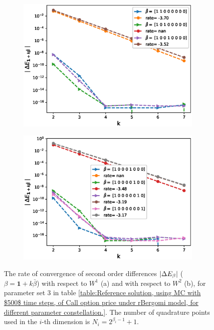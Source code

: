 \begin{figure}[h!]
	\centering
	\begin{subfigure}{.3\textwidth}
		\centering
		\includegraphics[width=1\linewidth]{./figures/rBergomi_mixed_error_rates/without_change_measure/N_4/H_002/mixed_difference_order2_rbergomi_4steps_H_002_K_1_totally_hierarch_with_rate_W1}
		\caption{}
		\label{fig:sub3}
	\end{subfigure}%
	\begin{subfigure}{.3\textwidth}
		\centering
		\includegraphics[width=1\linewidth]{./figures/rBergomi_mixed_error_rates/without_change_measure/N_4/H_002/mixed_difference_order2_rbergomi_4steps_H_002_K_1_totally_hierarch_with_rate_W2}
		\caption{}
		\label{fig:sub4}
	\end{subfigure}
	
	\caption{The rate of convergence of  second order differences $\left\lvert\Delta E_{\beta}\right\rvert$ ($\beta=\mathbf{1}+k \bar{\beta}$) with respect to $W^1$ (a)  and  with respect to $W^2$ (b), for parameter set $3$ in table \ref{table:Reference solution, using MC with $500$ time steps, of Call option price under rBergomi model, for different parameter constellation.}. The number of quadrature points used in the $i$-th dimension is $N_i=2^{\beta_i-1}+1$.}
	\label{fig:second_diff_comp_K_1_H_002}
\end{figure}

